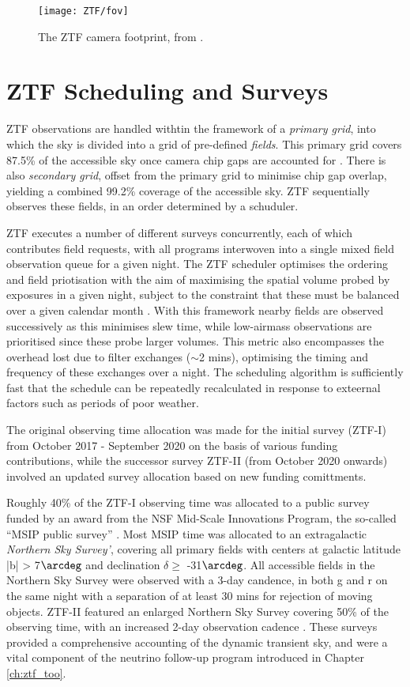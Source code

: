 \begin{figure}
	\centering \texttt{[image: ZTF/fov]}
	\caption{The ZTF camera footprint, from \cite{laher_18}.}
	\label{fig:ztf_footprint}
\end{figure}


\section{ZTF Scheduling and Surveys}
\label{sec:survey}

ZTF observations are handled withtin the framework of a \emph{primary grid}, into which the sky is divided into a grid of pre-defined \emph{fields}. This primary grid covers 87.5\% of the accessible sky once camera chip gaps are accounted for . There is also \emph{secondary grid}, offset from the primary grid to minimise chip gap overlap, yielding a combined 99.2\% coverage of the accessible sky. ZTF sequentially observes these fields, in an order determined by a schuduler. 

ZTF executes a number of different surveys concurrently, each of which contributes field requests, with all programs interwoven into a single mixed field observation queue for a given night. The ZTF scheduler optimises the ordering and field priotisation with the aim of maximising the spatial volume probed by exposures in a given night, subject to the constraint that these must be balanced over a given calendar month \cite{ztf_survey_19}. With this framework nearby fields are observed successively as this minimises slew time, while low-airmass observations are prioritised since these probe larger volumes. This metric also encompasses the overhead lost due to filter exchanges ($\sim$2 mins), optimising the timing and frequency of these exchanges over a night. The scheduling algorithm is sufficiently fast that the schedule can be repeatedly recalculated in response to exteernal factors such as periods of poor weather.

The original observing time allocation was made for the initial survey (ZTF-I) from October 2017 - September 2020 on the basis of various funding contributions, while the successor survey ZTF-II (from October 2020 onwards) involved an updated survey allocation based on new funding comittments.

Roughly 40\% of the ZTF-I observing time was allocated to a public survey funded by an award from the NSF Mid-Scale Innovations Program, the so-called ``MSIP public survey'' \cite{ztf_survey_19}. Most MSIP time was allocated to an extragalactic \emph{Northern Sky Survey'}, covering all primary fields with centers at galactic latitude |b| > 7$\arcdeg$ and declination $\delta \geq$ -31$\arcdeg$. All accessible fields in the Northern Sky Survey were observed with a 3-day candence, in both g and r on the same night with a separation of at least 30 mins for rejection of moving objects. ZTF-II featured an enlarged Northern Sky Survey covering 50\% of the observing time, with an increased 2-day observation cadence . These surveys provided a comprehensive accounting of the dynamic transient sky, and were a vital component of the neutrino follow-up program introduced in Chapter \ref{ch:ztf_too}.

